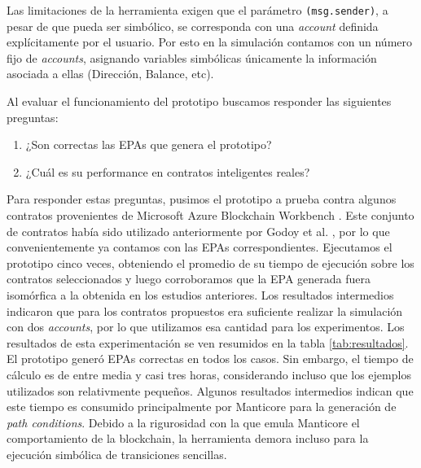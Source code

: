 Las limitaciones de la herramienta exigen que el parámetro \texttt{(msg.sender)}, a pesar de que pueda ser simbólico, se corresponda con una \textit{account} definida explícitamente por el usuario.
Por esto en la simulación contamos con un número fijo de \textit{accounts}, asignando variables simbólicas únicamente la información asociada a ellas (Dirección, Balance, etc).

Al evaluar el funcionamiento del prototipo buscamos responder las siguientes preguntas:
\begin{enumerate}
    \item ¿Son correctas las EPAs que genera el prototipo?
    \item ¿Cuál es su performance en contratos inteligentes reales?
\end{enumerate}
Para responder estas preguntas, pusimos el prototipo a prueba contra algunos contratos provenientes de Microsoft Azure Blockchain Workbench \cite{azure-benchmark}.
Este conjunto de contratos había sido utilizado anteriormente por Godoy et al. \cite{predicate-abstraction-for-smart-contract-validation}, por lo que convenientemente ya contamos con las EPAs correspondientes.
Ejecutamos el prototipo cinco veces, obteniendo el promedio de su tiempo de ejecución sobre los contratos seleccionados y luego corroboramos que la EPA generada fuera isomórfica a la obtenida en los estudios anteriores.
Los resultados intermedios indicaron que para los contratos propuestos era suficiente realizar la simulación con dos \textit{accounts}, por lo que utilizamos esa cantidad para los experimentos.
Los resultados de esta experimentación se ven resumidos en la tabla \ref{tab:resultados}.
El prototipo generó EPAs correctas en todos los casos.
Sin embargo, el tiempo de cálculo es de entre media y casi tres horas, considerando incluso que los ejemplos utilizados son relativmente pequeños.
Algunos resultados intermedios indican que este tiempo es consumido principalmente por Manticore para la generación de \textit{path conditions}.
Debido a la rigurosidad con la que emula Manticore el comportamiento de la blockchain, la herramienta demora incluso para la ejecución simbólica de transiciones sencillas.

